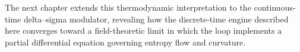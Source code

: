 The next chapter extends this thermodynamic interpretation to the continuous-time delta–sigma modulator, revealing how the discrete-time engine described here converges toward a field-theoretic limit in which the loop implements a partial differential equation governing entropy flow and curvature.

